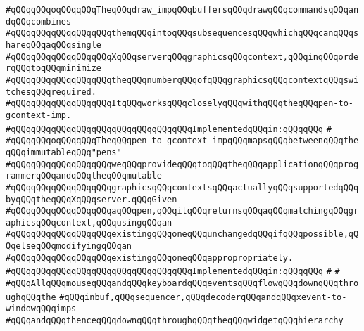 \verb|#qQQqqQQqoqQQqqQQqTheqQQqdraw_impqQQqbuffersqQQqdrawqQQqcommandsqQQqandqQQqcombines|\newline
\verb|#qQQqqQQqqQQqqQQqqQQqthemqQQqintoqQQqsubsequencesqQQqwhichqQQqcanqQQqshareqQQqaqQQqsingle|\newline
\verb|#qQQqqQQqqQQqqQQqqQQqXqQQqserverqQQqgraphicsqQQqcontext,qQQqinqQQqorderqQQqtoqQQqminimize|\newline
\verb|#qQQqqQQqqQQqqQQqqQQqtheqQQqnumberqQQqofqQQqgraphicsqQQqcontextqQQqswitchesqQQqrequired.|\newline
\verb|#qQQqqQQqqQQqqQQqqQQqItqQQqworksqQQqcloselyqQQqwithqQQqtheqQQqpen-to-gcontext-imp.|\newline
\verb|#qQQqqQQqqQQqqQQqqQQqqQQqqQQqqQQqqQQqImplementedqQQqin:qQQqqQQq|\newline
\verb|#|\newline
\verb|#qQQqqQQqoqQQqqQQqTheqQQqpen_to_gcontext_impqQQqmapsqQQqbetweenqQQqtheqQQqimmutableqQQq"pens"|\newline
\verb|#qQQqqQQqqQQqqQQqqQQqweqQQqprovideqQQqtoqQQqtheqQQqapplicationqQQqprogrammerqQQqandqQQqtheqQQqmutable|\newline
\verb|#qQQqqQQqqQQqqQQqqQQqgraphicsqQQqcontextsqQQqactuallyqQQqsupportedqQQqbyqQQqtheqQQqXqQQqserver.qQQqGiven|\newline
\verb|#qQQqqQQqqQQqqQQqqQQqaqQQqpen,qQQqitqQQqreturnsqQQqaqQQqmatchingqQQqgraphicsqQQqcontext,qQQqusingqQQqan|\newline
\verb|#qQQqqQQqqQQqqQQqqQQqexistingqQQqoneqQQqunchangedqQQqifqQQqpossible,qQQqelseqQQqmodifyingqQQqan|\newline
\verb|#qQQqqQQqqQQqqQQqqQQqexistingqQQqoneqQQqappropropriately.|\newline
\verb|#qQQqqQQqqQQqqQQqqQQqqQQqqQQqqQQqqQQqImplementedqQQqin:qQQqqQQq|\newline
\verb|#|\newline
\verb|#|\newline
\verb|#qQQqAllqQQqmouseqQQqandqQQqkeyboardqQQqeventsqQQqflowqQQqdownqQQqthroughqQQqthe|\newline
\verb|#qQQqinbuf,qQQqsequencer,qQQqdecoderqQQqandqQQqxevent-to-windowqQQqimps|\newline
\verb|#qQQqandqQQqthenceqQQqdownqQQqthroughqQQqtheqQQqwidgetqQQqhierarchy|\newline
